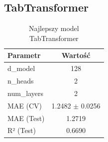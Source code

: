 \subsection{TabTransformer}

\begin{table}[H]
\centering
\caption{Najlepszy model TabTransformer}
\begin{tabular}{lc}
\toprule
Parametr & Wartość \\
\midrule
d\_model & 128 \\
n\_heads & 2 \\
num\_layers & 2 \\
MAE (CV) & 1.2482 $\pm$ 0.0256 \\
MAE (Test) & 1.2719 \\
R² (Test) & 0.6690 \\
\bottomrule
\end{tabular}
\end{table}
